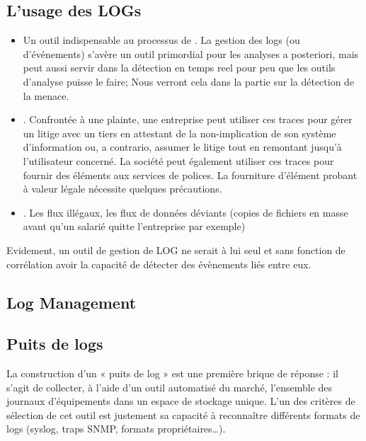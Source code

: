  \subsection{L'usage des LOGs}
 
 
 \begin{itemize}

   \item Un outil indispensable au processus de . La gestion des logs (ou d’événements) s’avère un outil primordial pour les analyses a posteriori, mais peut aussi servir dans la détection en temps reel pour peu que les outils d'analyse puisse le faire; Nous verront cela dans la partie sur la détection de la menace.

   \item  {}. Confrontée à une plainte, une entreprise peut utiliser ces traces pour gérer un litige avec un tiers  en attestant de la non-implication de son système d’information ou, a contrario, assumer le litige tout en remontant jusqu’à l’utilisateur concerné. La société peut également utiliser ces traces pour fournir des éléments aux services de polices. La fourniture d'élément probant à valeur légale nécessite quelques précautions. 

   \item  {}. Les flux illégaux, les flux de données déviants (copies de fichiers en masse avant qu'un salarié quitte l'entreprise par exemple)

\end{itemize}

 Evidement, un outil de gestion de LOG ne serait à lui seul et sans fonction de corrélation avoir la capacité de détecter des évènements liés entre eux. 

\subsection{Log Management}

\subsection{Puits de logs}

La construction d’un « puits de log » est une première brique de réponse : il s’agit de collecter, à l’aide d’un outil automatisé du marché, l’ensemble des journaux d’équipements dans un espace de stockage unique. L’un des critères de sélection de cet outil est justement sa capacité à reconnaître différents formats de logs (syslog, traps SNMP, formats propriétaires…).

